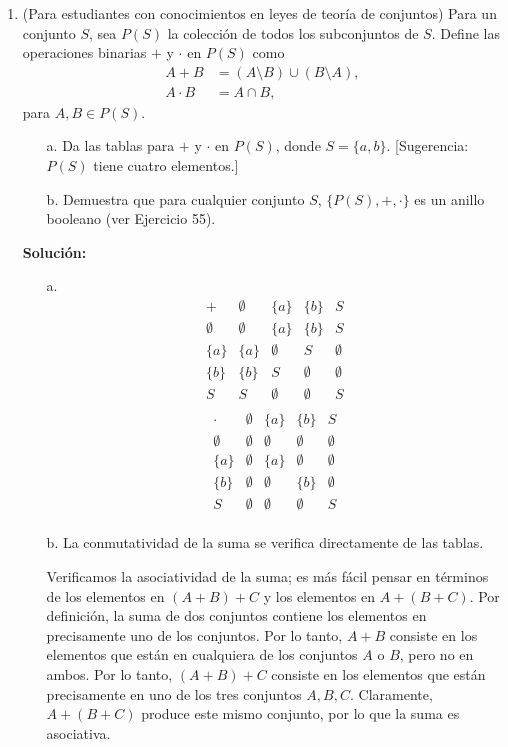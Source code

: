 \begin{enumerate}
	
	\item
	
	(Para estudiantes con conocimientos en leyes de teoría de conjuntos) Para un conjunto $S$, sea $P(S)$ la colección de todos los subconjuntos de $S$. Define las operaciones binarias $+$ y $\cdot$ en $P(S)$ como
	\begin{align*}
		A + B &= (A \setminus B) \cup (B \setminus A), \\
		A \cdot B &= A \cap B,
	\end{align*}
	para $A, B \in P(S)$.
	\begin{enumerate}
		\item[a.] Da las tablas para $+$ y $\cdot$ en $P(S)$, donde $S = \{a, b\}$. [Sugerencia: $P(S)$ tiene cuatro elementos.]
		\item[b.] Demuestra que para cualquier conjunto $S$, $\{P(S), +, \cdot\}$ es un anillo booleano (ver Ejercicio 55).
	\end{enumerate}
	\textbf{Solución:}
	
	\begin{enumerate}
		\item[a.]
		\[
		\begin{array}{c|cccc}
			+ & \emptyset & \{a\} & \{b\} & S \\
			\hline
			\emptyset & \emptyset & \{a\} & \{b\} & S \\
			\{a\} & \{a\} & \emptyset & S & \emptyset \\
			\{b\} & \{b\} & S & \emptyset & \emptyset \\
			S & S & \emptyset & \emptyset & S \\
		\end{array}
		\]
		\[
		\begin{array}{c|cccc}
			\cdot & \emptyset & \{a\} & \{b\} & S \\
			\hline
			\emptyset & \emptyset & \emptyset & \emptyset & \emptyset \\
			\{a\} & \emptyset & \{a\} & \emptyset & \emptyset \\
			\{b\} & \emptyset & \emptyset & \{b\} & \emptyset \\
			S & \emptyset & \emptyset & \emptyset & S \\
		\end{array}
		\]
		
		\item[b.] La conmutatividad de la suma se verifica directamente de las tablas.
		
		Verificamos la asociatividad de la suma; es más fácil pensar en términos de los elementos en $(A + B) + C$ y los elementos en $A + (B + C)$. Por definición, la suma de dos conjuntos contiene los elementos en precisamente uno de los conjuntos. Por lo tanto, $A + B$ consiste en los elementos que están en cualquiera de los conjuntos $A$ o $B$, pero no en ambos. Por lo tanto, $(A + B) + C$ consiste en los elementos que están precisamente en uno de los tres conjuntos $A, B, C$. Claramente, $A + (B + C)$ produce este mismo conjunto, por lo que la suma es asociativa.
		

\end{enumerate}
\end{enumerate}
